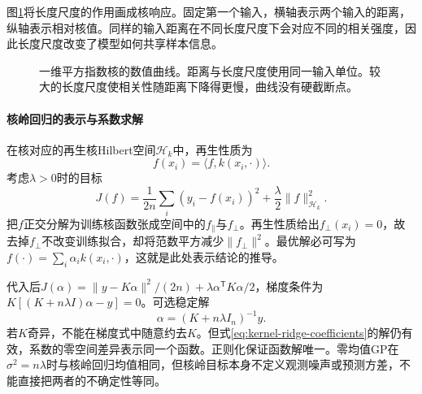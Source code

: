 图\ref{fig:kernel-length-scale}将长度尺度的作用画成核响应。固定第一个输入，横轴表示两个输入的距离，纵轴表示相对核值。同样的输入距离在不同长度尺度下会对应不同的相关强度，因此长度尺度改变了模型如何共享样本信息。
\begin{figure}[htbp]
\centering
{}
\caption{一维平方指数核的数值曲线。距离与长度尺度使用同一输入单位。较大的长度尺度使相关性随距离下降得更慢，曲线没有硬截断点。}
\label{fig:kernel-length-scale}
\end{figure}

\paragraph{核岭回归的表示与系数求解}
在核对应的再生核Hilbert空间$\mathcal H_k$中，再生性质为
\begin{equation}
 f(x_i)=\langle f,k(x_i,\cdot)\rangle.
\end{equation}
考虑$\lambda>0$时的目标
\begin{equation}
 J(f)=\frac1{2n}\sum_i(y_i-f(x_i))^2+\frac\lambda2\|f\|_{\mathcal H_k}^2.
\end{equation}
把$f$正交分解为训练核函数张成空间中的$f_\parallel$与$f_\perp$。再生性质给出$f_\perp(x_i)=0$，故去掉$f_\perp$不改变训练拟合，却将范数平方减少$\|f_\perp\|^2$。最优解必可写为$f(\cdot)=\sum_i\alpha_i k(x_i,\cdot)$，这就是此处表示结论的推导。

代入后$J(\alpha)=\|y-K\alpha\|^2/(2n)+\lambda\alpha^{\mathsf T}K\alpha/2$，梯度条件为$K[(K+n\lambda I)\alpha-y]=0$。可选稳定解
\begin{equation}
 \alpha=(K+n\lambda I_n)^{-1}y.\label{eq:kernel-ridge-coefficients}
\end{equation}
若$K$奇异，不能在梯度式中随意约去$K$。但式\eqref{eq:kernel-ridge-coefficients}的解仍有效，系数的零空间差异表示同一个函数。正则化保证函数解唯一。零均值GP在$\sigma^2=n\lambda$时与核岭回归均值相同，但核岭目标本身不定义观测噪声或预测方差，不能直接把两者的不确定性等同。

